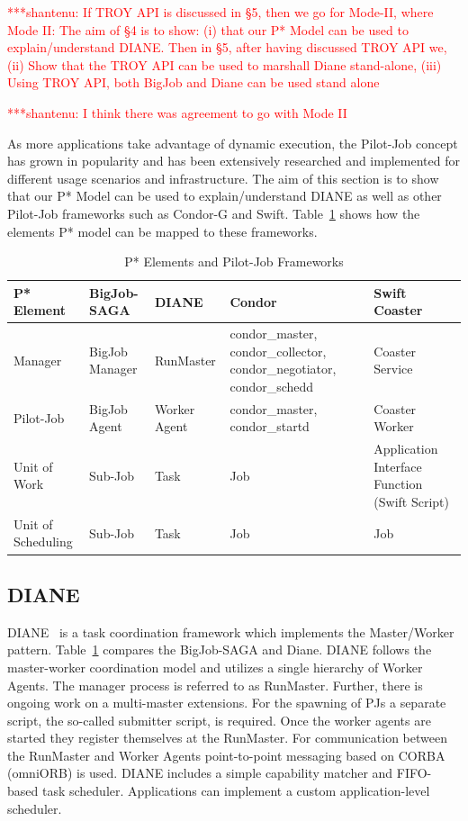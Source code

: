 \documentclass[conference,final]{IEEEtran}
\newcommand{\jhanote}[1]{ {\textcolor{red} { ***shantenu: #1 }}}
\newcommand{\jhanote}[1]{}
\begin{document}
\jhanote{If TROY API is discussed in \S 5, then we go for Mode-II,
  where Mode II: The aim of \S 4 is to show: (i) that our P* Model can
  be used to explain/understand DIANE.  Then in \S 5, after having
  discussed TROY API we, (ii) Show that the TROY API can be used to
  marshall Diane stand-alone, (iii) Using TROY API, both BigJob and
  Diane can be used stand alone}

\jhanote{I think there was agreement to go with Mode II}

As more applications take advantage of dynamic execution, the Pilot-Job concept
has grown in popularity and has been extensively researched and implemented for
different usage scenarios and infrastructure. The aim of this section is to show
that our P* Model can be used to explain/understand DIANE as well as other
Pilot-Job frameworks such as Condor-G and Swift.
Table~\ref{table:bigjob-saga-diane} shows how the elements P* model can be
mapped to these frameworks.

\begin{table}[t]
\centering
\begin{tabular}{|p{2.5cm}|p{3cm}|p{3cm}|p{3cm}|p{3cm}|}
\hline
\textbf{P* Element} &\textbf{BigJob-SAGA} &\textbf{DIANE} &\textbf{Condor} 
&\textbf{Swift Coaster}  \\
\hline
Manager &BigJob Manager & RunMaster & condor\_master, condor\_collector, condor\_negotiator, condor\_schedd &Coaster Service\\ 
\hline
Pilot-Job &BigJob Agent  & Worker Agent &condor\_master, condor\_startd &Coaster Worker\\
\hline
Unit of Work &Sub-Job &Task &Job &Application Interface Function (Swift Script)\\
\hline
Unit of Scheduling &Sub-Job &Task &Job &Job\\
\hline
\end{tabular}
\caption{P* Elements and Pilot-Job Frameworks} \label{table:bigjob-saga-diane}
\end{table}

\subsection{DIANE}

DIANE~\cite{Moscicki:908910} is a task coordination framework which implements
the Master/Worker pattern. Table~\ref{table:bigjob-saga-diane} compares the
BigJob-SAGA and Diane. DIANE follows the master-worker coordination model and
utilizes a single hierarchy of Worker Agents. The manager process is referred to
as RunMaster. Further, there is ongoing work on a multi-master extensions. For
the spawning of PJs a separate script, the so-called submitter script, is
required. Once the worker agents are started they register themselves at the
RunMaster. For communication between the RunMaster and Worker Agents
point-to-point messaging based on CORBA (omniORB) is used. DIANE includes a
simple capability matcher and FIFO-based task scheduler. Applications can
implement a custom application-level scheduler.
\end{document}
